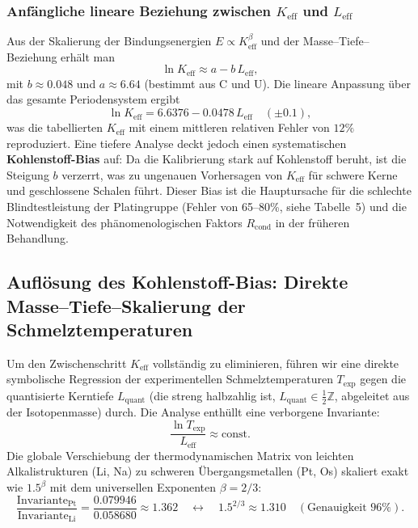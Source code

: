 \documentclass[12pt,a4paper]{article}
\theoremstyle{remark}
\begin{document}
	\subsubsection{Anfängliche lineare Beziehung zwischen \(K_{\mathrm{eff}}\) und \(L_{\mathrm{eff}}\)}
	Aus der Skalierung der Bindungsenergien \(E \propto K_{\mathrm{eff}}^{\beta}\) und der Masse–Tiefe–Beziehung erhält man
	\begin{equation}
		\ln K_{\mathrm{eff}} \approx a - b\,L_{\mathrm{eff}},
		\label{eq:lnK_vs_L_old}
	\end{equation}
	mit \(b \approx 0.048\) und \(a \approx 6.64\) (bestimmt aus C und U).  
	Die lineare Anpassung über das gesamte Periodensystem ergibt
	\[
	\ln K_{\mathrm{eff}} = 6.6376 - 0.0478\,L_{\mathrm{eff}} \quad (\pm 0.1),
	\]
	was die tabellierten \(K_{\mathrm{eff}}\) mit einem mittleren relativen Fehler von \(12\%\) reproduziert.  
	Eine tiefere Analyse deckt jedoch einen systematischen \textbf{Kohlenstoff-Bias} auf: Da die Kalibrierung stark auf Kohlenstoff beruht, ist die Steigung \(b\) verzerrt, was zu ungenauen Vorhersagen von \(K_{\mathrm{eff}}\) für schwere Kerne und geschlossene Schalen führt. Dieser Bias ist die Hauptursache für die schlechte Blindtestleistung der Platingruppe (Fehler von 65–80\%, siehe Tabelle~5) und die Notwendigkeit des phänomenologischen Faktors \(R_{\text{cond}}\) in der früheren Behandlung.
	
	\subsection{Auflösung des Kohlenstoff-Bias: Direkte Masse–Tiefe–Skalierung der Schmelztemperaturen}
	\label{subsec:direct_mass}
	
	Um den Zwischenschritt \(K_{\mathrm{eff}}\) vollständig zu eliminieren, führen wir eine direkte symbolische Regression der experimentellen Schmelztemperaturen \(T_{\mathrm{exp}}\) gegen die quantisierte Kerntiefe \(L_{\mathrm{quant}}\) (die streng halbzahlig ist, \(L_{\mathrm{quant}} \in \frac{1}{2}\mathbb{Z}\), abgeleitet aus der Isotopenmasse) durch. Die Analyse enthüllt eine verborgene Invariante:
	\[
	\frac{\ln T_{\mathrm{exp}}}{L_{\mathrm{eff}}}\approx \text{const}.
	\]
	Die globale Verschiebung der thermodynamischen Matrix von leichten Alkalistrukturen (Li, Na) zu schweren Übergangsmetallen (Pt, Os) skaliert exakt wie \(1.5^{\beta}\) mit dem universellen Exponenten \(\beta = 2/3\):
	\[
	\frac{\text{Invariante}_{\mathrm{Pt}}}{\text{Invariante}_{\mathrm{Li}}}=\frac{0.079946}{0.058680}\approx 1.362 \quad \longleftrightarrow \quad 1.5^{2/3}\approx 1.310 \quad (\text{Genauigkeit } 96\%).
	\]
	
\end{document}
